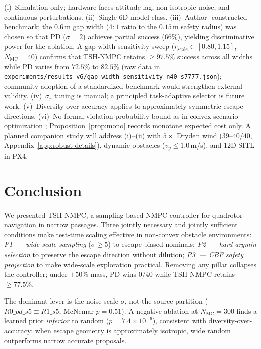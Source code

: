 \documentclass[11pt,onecolumn,a4paper]{article}
\newcommand{\Nm}{N_{\mathrm{MC}}}
\begin{document}
(i)~Simulation only; hardware faces attitude lag, non-isotropic noise,
and continuous perturbations. (ii)~Single 6D model class. (iii)~Author-
constructed benchmark; the $0.6\,$m gap width ($4{:}1$ ratio to the
$0.15\,$m safety radius) was chosen so that PD ($\sigma = 2$) achieves
partial success ($66\%$), yielding discriminative power for the
ablation. A gap-width sensitivity sweep ($r_{\mathrm{scale}} \in
[0.80, 1.15]$, $\Nm = 40$) confirms that TSH-NMPC retains
$\ge 97.5\%$ success across all widths while PD varies from
$72.5\%$ to $82.5\%$ (raw data in
\texttt{experiments/results\_v6/gap\_width\_sensitivity\_n40\_s7777.json});
community adoption of a standardized benchmark would strengthen external
validity. (iv)~$\sigma_r$ tuning is manual; a principled task-adaptive
selector is future work. (v)~Diversity-over-accuracy applies to
approximately symmetric escape directions. (vi)~No formal violation-probability
bound as in convex scenario optimization \cite{CAM08};
Proposition~\ref{prop:mono} records monotone expected cost only.
A planned companion study will address (i)--(ii) with $5\times$ Dryden
wind ($39$--$40/40$, Appendix~\ref{app:robust-details}), dynamic
obstacles ($v_y \le 1.0\,$m/s), and 12D SITL in PX4.

\section{Conclusion}\label{sec:conclusion}

We presented TSH-NMPC, a sampling-based NMPC controller for quadrotor
navigation in narrow passages. Three jointly necessary and jointly
sufficient conditions make test-time scaling effective in non-convex
obstacle environments:
\emph{P1~--- wide-scale sampling} ($\sigma \ge 5$) to escape biased
nominals; \emph{P2~--- hard-argmin selection} to preserve the escape
direction without dilution; \emph{P3~--- CBF safety projection} to
make wide-scale exploration practical. Removing any pillar collapses
the controller; under $+50\%$ mass, PD wins $0/40$ while TSH-NMPC
retains $\ge 77.5\%$.

The dominant lever is the noise scale $\sigma$, not the source
partition ($R0\_pd\_s5 \equiv R1\_s5$, McNemar $p = 0.51$). A
negative ablation at $\Nm = 300$ finds a learned prior \emph{inferior}
to random ($p = 7.4 \times 10^{-6}$), consistent with
diversity-over-accuracy: when escape geometry is approximately
isotropic, wide random outperforms narrow accurate proposals.
\end{document}
